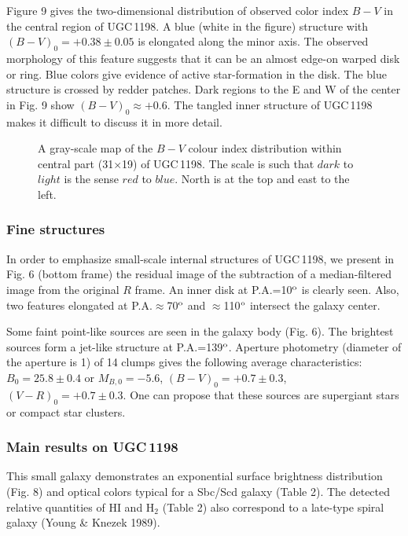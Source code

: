 \documentclass[]{aa}
\begin{document}
Figure 9 gives the two-dimensional distribution of observed 
color index $B-V$ in the central region of UGC\,1198. A blue (white
in the figure) structure with $(B-V)_0=+0.38\pm0.05$ is elongated 
along the minor axis. The observed morphology of this feature suggests
that it can be an almost edge-on warped disk or ring. Blue colors 
give evidence of active star-formation in the disk. The blue 
structure is crossed by redder patches. Dark regions to the E and W
of the center in Fig. 9 show $(B-V)_0\approx+0.6$. The tangled
inner structure of UGC\,1198 makes it difficult to discuss it in
more detail.

\begin{figure}
\centerline{}
\caption{A gray-scale map of the $B-V$ colour index distribution
within central part (31$\times$19) of UGC\,1198.
The scale is such that $dark$ to $light$ is the sense $red$ to
$blue$. North is at the top and east to the left. }
\end{figure}

\subsubsection{Fine structures}

In order to emphasize small-scale internal structures of UGC\,1198,
we present in Fig. 6 (bottom frame) the residual image of the 
subtraction of a median-filtered image from the original $R$ frame. 
An inner disk at P.A.=10$^{\rm o}$ is clearly seen. Also, two features
elongated at P.A.$\approx$70$^{\rm o}$ and $\approx$110$^{\rm o}$
intersect the galaxy center. 

Some faint point-like sources are seen in the galaxy body (Fig. 6). 
The brightest sources form a jet-like structure at P.A.=139$^{\rm o}$. 
Aperture photometry (diameter of the aperture is 1) of 14 clumps 
gives the following average characteristics: $B_0=25.8\pm0.4$ or
$M_{B,0}=-5.6$, $(B-V)_0=+0.7\pm0.3$, $(V-R)_0=+0.7\pm0.3$. 
One can propose that these sources are supergiant stars
or compact star clusters.

\subsubsection{Main results on UGC\,1198}

This small galaxy demonstrates an exponential surface brightness
distribution (Fig. 8) and optical colors typical for a Sbc/Scd
galaxy (Table 2). The detected relative quantities of HI and
H$_2$ (Table 2) also correspond to a late-type spiral galaxy 
(Young \& Knezek 1989). 
\end{document}
